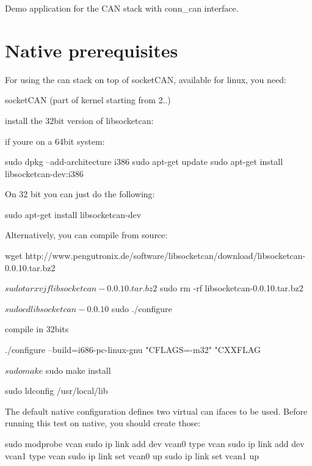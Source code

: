 Demo application for the C\+AN stack with conn\+\_\+can interface.

\section*{Native prerequisites }

For using the can stack on top of socket\+C\+AN, available for linux, you need\+:
\begin{DoxyItemize}
\item socket\+C\+AN (part of kernel starting from 2..)
\item install the 32bit version of libsocketcan\+:
\end{DoxyItemize}

if you\textquotesingle{}re on a 64bit system\+: 
\begin{DoxyCode}
sudo dpkg --add-architecture i386
sudo apt-get update
sudo apt-get install libsocketcan-dev:i386
\end{DoxyCode}
 On 32 bit you can just do the following\+: 
\begin{DoxyCode}
sudo apt-get install libsocketcan-dev
\end{DoxyCode}


Alternatively, you can compile from source\+: 
\begin{DoxyCode}
wget http://www.pengutronix.de/software/libsocketcan/download/libsocketcan-0.0.10.tar.bz2

$ sudo tar xvjf libsocketcan-0.0.10.tar.bz2

$ sudo rm -rf libsocketcan-0.0.10.tar.bz2

$ sudo cd libsocketcan-0.0.10

$ sudo ./configure

compile in 32bits

./configure --build=i686-pc-linux-gnu "CFLAGS=-m32" "CXXFLAG

$ sudo make

$ sudo make install


sudo ldconfig
/usr/local/lib
\end{DoxyCode}


The default native configuration defines two virtual can ifaces to be used. Before running this test on native, you should create those\+:


\begin{DoxyCode}
sudo modprobe vcan
sudo ip link add dev vcan0 type vcan
sudo ip link add dev vcan1 type vcan
sudo ip link set vcan0 up
sudo ip link set vcan1 up
\end{DoxyCode}


